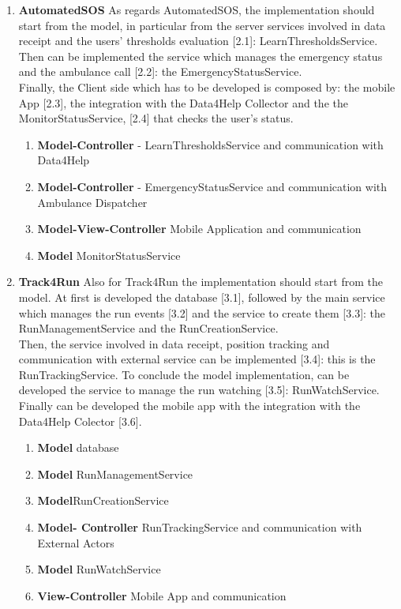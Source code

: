 \documentclass[a4paper]{article}
\begin{document}
\begin{enumerate}[label*=\bf{\arabic*.}]
\item \textbf{AutomatedSOS}
As regards AutomatedSOS, the implementation should start from the model, in particular from the server services involved in data receipt and the users' thresholds evaluation [2.1]: LearnThresholdsService.\\
Then  can be implemented the service which manages the emergency status and the ambulance call [2.2]: the EmergencyStatusService.\\
Finally, the Client side which has to be developed is composed by: the mobile App [2.3], the integration with the Data4Help Collector and the the MonitorStatusService, [2.4] that checks the user's status.

\begin{enumerate}[label*=\bf{.\arabic*}]
    \item \textbf{Model-Controller} - LearnThresholdsService and communication with Data4Help
    \item \textbf{Model-Controller} - EmergencyStatusService and communication with Ambulance Dispatcher
    \item \textbf{Model-View-Controller} Mobile Application and communication
    \item \textbf{Model} MonitorStatusService
\end{enumerate}

\item \textbf{Track4Run}
Also for Track4Run the implementation should start from the model. At first is developed the database [3.1], followed by the main service which manages the run events [3.2] and the service to create them [3.3]: the RunManagementService and the RunCreationService.\\
Then, the service involved in data receipt, position tracking and communication with external service can be implemented [3.4]: this is the RunTrackingService. To conclude the model implementation, can be developed the service to manage the run watching [3.5]: RunWatchService.\\
Finally can be developed the mobile app with the integration with the Data4Help Colector [3.6].

\begin{enumerate}[label*=\bf{.\arabic*}]
    \item \textbf{Model} database
    \item \textbf{Model} RunManagementService
    \item \textbf{Model}RunCreationService
    \item \textbf{Model- Controller} RunTrackingService and communication with External Actors
    \item \textbf{Model} RunWatchService
    \item \textbf{View-Controller} Mobile App and communication
\end{enumerate}
\end{enumerate}
\end{document}
